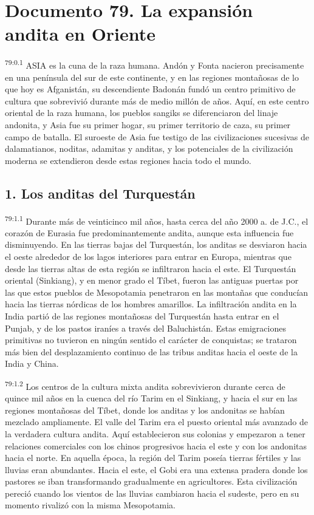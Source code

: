 \chapter{Documento 79. La expansión andita en Oriente}
\par
\textsuperscript{79:0.1} ASIA es la cuna de la raza humana. Andón y Fonta nacieron precisamente en una península del sur de este continente, y en las regiones montañosas de lo que hoy es Afganistán, su descendiente Badonán fundó un centro primitivo de cultura que sobrevivió durante más de medio millón de años. Aquí, en este centro oriental de la raza humana, los pueblos sangiks se diferenciaron del linaje andonita, y Asia fue su primer hogar, su primer territorio de caza, su primer campo de batalla. El suroeste de Asia fue testigo de las civilizaciones sucesivas de dalamatianos, noditas, adamitas y anditas, y los potenciales de la civilización moderna se extendieron desde estas regiones hacia todo el mundo.

\section*{1. Los anditas del Turquestán}
\par
\textsuperscript{79:1.1} Durante más de veinticinco mil años, hasta cerca del año 2000 a. de J.C., el corazón de Eurasia fue predominantemente andita, aunque esta influencia fue disminuyendo. En las tierras bajas del Turquestán, los anditas se desviaron hacia el oeste alrededor de los lagos interiores para entrar en Europa, mientras que desde las tierras altas de esta región se infiltraron hacia el este. El Turquestán oriental (Sinkiang), y en menor grado el Tíbet, fueron las antiguas puertas por las que estos pueblos de Mesopotamia penetraron en las montañas que conducían hacia las tierras nórdicas de los hombres amarillos. La infiltración andita en la India partió de las regiones montañosas del Turquestán hasta entrar en el Punjab, y de los pastos iraníes a través del Baluchistán. Estas emigraciones primitivas no tuvieron en ningún sentido el carácter de conquistas; se trataron más bien del desplazamiento continuo de las tribus anditas hacia el oeste de la India y China.

\par
\textsuperscript{79:1.2} Los centros de la cultura mixta andita sobrevivieron durante cerca de quince mil años en la cuenca del río Tarim en el Sinkiang, y hacia el sur en las regiones montañosas del Tíbet, donde los anditas y los andonitas se habían mezclado ampliamente. El valle del Tarim era el puesto oriental más avanzado de la verdadera cultura andita. Aquí establecieron sus colonias y empezaron a tener relaciones comerciales con los chinos progresivos hacia el este y con los andonitas hacia el norte. En aquella época, la región del Tarim poseía tierras fértiles y las lluvias eran abundantes. Hacia el este, el Gobi era una extensa pradera donde los pastores se iban transformando gradualmente en agricultores. Esta civilización pereció cuando los vientos de las lluvias cambiaron hacia el sudeste, pero en su momento rivalizó con la misma Mesopotamia.

